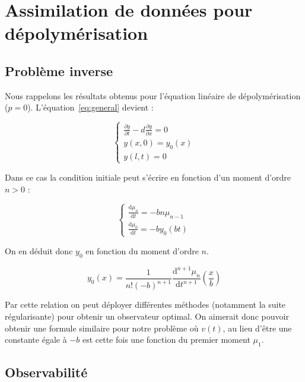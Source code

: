 \documentclass[a4paper]{article}
\theoremstyle{definition}
\theoremstyle{remark}
\newcommand{\pol}{p}
\newcommand{\dep}{d}
\begin{document}
\section{Assimilation de données pour dépolymérisation}




\subsection{Problème inverse}

Nous rappelons les résultats obtenus pour l'équation linéaire de dépolymérisation ($\pol =0$). L'équation~\eqref{eq:general} devient :

\begin{equation}
	\label{eq:depol}
	\begin{cases}
	    \frac{\partial y}{\partial t}-\dep \frac{\partial y} {\partial x}  = 0  \\
	    y(x,0) = y_{0} (x)\\
		y(l,t) = 0
	\end{cases}
\end{equation}

Dans ce cas la condition initiale peut s'écrire en fonction d'un moment d'ordre $n>0$ :

\[
\begin{cases}
\frac{\mathrm{d} \mu_n }{\mathrm{d}t} = -b n \mu_{n-1} \\
\frac{\mathrm{d} \mu_0 }{\mathrm{d}t} = -b y_0(bt)
\end{cases}
\]


On en déduit donc $y_0$ en fonction du moment d'ordre $n$.

\[
y_0(x) = \frac{1}{n! (-b)^{n+1}} \frac{\mathrm{d}^{n+1} \mu_n }{\mathrm{d}t^{n+1}}(\frac{x}{b})
\]

Par cette relation on peut déployer différentes méthodes (notamment la suite régularisante) pour obtenir un observateur optimal. 
On aimerait donc pouvoir obtenir une formule similaire pour notre problème où $v(t)$, au lieu d'être une constante égale à $-b$ est cette fois une fonction du premier moment $\mu_1$.


\subsection{Observabilité}
\end{document}
